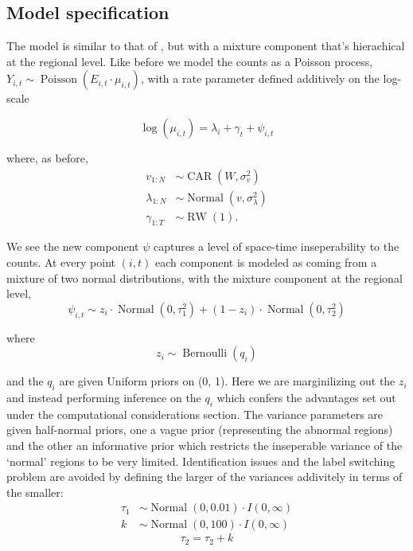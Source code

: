 \documentclass{article}
\begin{document}
\subsection{Model specification}

The model is similar to that of \cite{stability}, but with a mixture component that's hierachical at the regional level. Like before we model the counts as a Poisson process, $Y_{i,t} \sim \operatorname{Poisson}(E_{i,t} \cdot \mu_{i,t})$, with a rate parameter defined additively on the log-scale

\begin{equation}
\log(\mu_{i,t}) = \lambda_i + \gamma_t + \psi_{i,t}
\end{equation}

where, as before,
\begin{align}
v_{1:N} &\sim \operatorname{CAR}(W, \sigma_v^2) \\
\lambda_{1:N} &\sim \operatorname{Normal}(v, \sigma_\lambda^2) \\
\gamma_{1:T} &\sim \operatorname{RW}(1).
\end{align}

We see the new component $\psi$ captures a level of space-time inseperability to the counts. At every point $(i, t)$ each component is modeled as coming from a mixture of two normal distributions, with the mixture component at the regional level,
\begin{equation}
\psi_{i,t} \sim z_i \cdot \operatorname{Normal}(0, \tau_1^2) + (1 - z_i) \cdot \operatorname{Normal}(0, \tau_2^2)
\end{equation} 

where
\begin{equation}
  z_i \sim \operatorname{Bernoulli}(q_i)
\end{equation}

and the $q_i$ are given Uniform priors on (0, 1). Here we are marginilizing out the $z_i$ and instead performing inference on the $q_i$ which confers the advantages set out under the computational considerations section. The variance parameters are given half-normal priors, one a vague prior (representing the abnormal regions) and the other an informative prior which restricts the inseperable variance of the `normal' regions to be very limited. Identification issues and the label switching problem are avoided by defining the larger of the variances addivitely in terms of the smaller:
\begin{align}
  \tau_1 &\sim \operatorname{Normal}(0, 0.01) \cdot I(0, \infty) \\
  k &\sim \operatorname{Normal}(0, 100) \cdot I(0, \infty)
\end{align}
\begin{equation}
 \tau_2 = \tau_2 + k
\end{equation}
\end{document}
